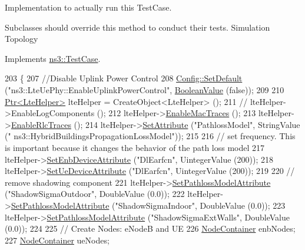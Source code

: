 Implementation to actually run this Test\+Case. 

Subclasses should override this method to conduct their tests. Simulation Topology

Implements \hyperlink{classns3_1_1TestCase_a8ff74680cf017ed42011e4be51917a24}{ns3\+::\+Test\+Case}.


\begin{DoxyCode}
203 \{
207   \textcolor{comment}{//Disable Uplink Power Control}
208   \hyperlink{group__config_ga2e7882df849d8ba4aaad31c934c40c06}{Config::SetDefault} (\textcolor{stringliteral}{"ns3::LteUePhy::EnableUplinkPowerControl"}, 
      \hyperlink{classns3_1_1BooleanValue}{BooleanValue} (\textcolor{keyword}{false}));
209 
210   \hyperlink{classns3_1_1Ptr}{Ptr<LteHelper>} lteHelper = CreateObject<LteHelper> ();
211   \textcolor{comment}{//   lteHelper->EnableLogComponents ();}
212   lteHelper->\hyperlink{classns3_1_1LteHelper_affa3a12841520407d3662417fe41863d}{EnableMacTraces} ();
213   lteHelper->\hyperlink{classns3_1_1LteHelper_abadfdd04d30b261e9b6f0846b4784928}{EnableRlcTraces} ();
214   lteHelper->\hyperlink{classns3_1_1ObjectBase_ac60245d3ea4123bbc9b1d391f1f6592f}{SetAttribute} (\textcolor{stringliteral}{"PathlossModel"}, StringValue (\textcolor{stringliteral}{"
      ns3::HybridBuildingsPropagationLossModel"}));
215 
216   \textcolor{comment}{// set frequency. This is important because it changes the behavior of the path loss model}
217   lteHelper->\hyperlink{classns3_1_1LteHelper_ac42f0f3d6cd8473d810bfbbeb5d592e0}{SetEnbDeviceAttribute} (\textcolor{stringliteral}{"DlEarfcn"}, UintegerValue (200));
218   lteHelper->\hyperlink{classns3_1_1LteHelper_ae85f256c4356b977d60a877dbbea1857}{SetUeDeviceAttribute} (\textcolor{stringliteral}{"DlEarfcn"}, UintegerValue (200));
219 
220   \textcolor{comment}{// remove shadowing component}
221   lteHelper->\hyperlink{classns3_1_1LteHelper_aa96ebbd6845ca61c2b5e08e84481a348}{SetPathlossModelAttribute} (\textcolor{stringliteral}{"ShadowSigmaOutdoor"}, DoubleValue (0.0));
222   lteHelper->\hyperlink{classns3_1_1LteHelper_aa96ebbd6845ca61c2b5e08e84481a348}{SetPathlossModelAttribute} (\textcolor{stringliteral}{"ShadowSigmaIndoor"}, DoubleValue (0.0));
223   lteHelper->\hyperlink{classns3_1_1LteHelper_aa96ebbd6845ca61c2b5e08e84481a348}{SetPathlossModelAttribute} (\textcolor{stringliteral}{"ShadowSigmaExtWalls"}, DoubleValue (0.0));
224   
225   \textcolor{comment}{// Create Nodes: eNodeB and UE}
226   \hyperlink{classns3_1_1NodeContainer}{NodeContainer} enbNodes;
227   \hyperlink{classns3_1_1NodeContainer}{NodeContainer} ueNodes;

\end{DoxyCode}
